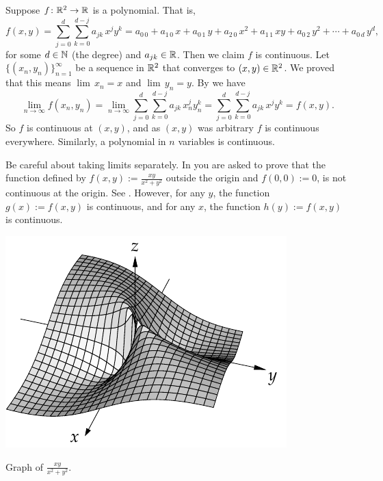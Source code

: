 \begin{example}
Suppose $f \colon {\mathbb{R}}^2 \to {\mathbb{R}}$ is a polynomial.  That is,
\begin{equation*}
f(x,y) =
\sum_{j=0}^d
\sum_{k=0}^{d-j}
a_{jk}\,x^jy^k =
a_{0\,0} + a_{1\,0} \, x +
a_{0\,1} \, y+  
a_{2\,0} \, x^2+  
a_{1\,1} \, xy+  
a_{0\,2} \, y^2+ \cdots +
a_{0\,d} \, y^d ,
\end{equation*}
for some $d \in {\mathbb{N}}$ (the degree) and $a_{jk} \in {\mathbb{R}}$.  Then we claim 
$f$ is continuous.  Let $\{ (x_n,y_n) \}_{n=1}^\infty$ be a sequence
in ${\mathbb{R}}^2$ that converges to $(x,y) \in {\mathbb{R}}^2$.  We proved that this
means $\lim\, x_n = x$ and $\lim\, y_n = y$.
By  we have
\begin{equation*}
\lim_{n\to\infty}
f(x_n,y_n) =
\lim_{n\to\infty}
\sum_{j=0}^d
\sum_{k=0}^{d-j}
a_{jk} \, x_n^jy_n^k 
=
\sum_{j=0}^d
\sum_{k=0}^{d-j}
a_{jk} \, x^jy^k
=
f(x,y) .
\end{equation*}
So $f$ is continuous at $(x,y)$, and as $(x,y)$ was arbitrary $f$ is
continuous everywhere.  Similarly, a
polynomial in $n$ variables is continuous.
\end{example}

Be careful about taking limits separately.  In 
you are asked to prove that the function defined by $f(x,y) := \frac{xy}{x^2+y^2}$
outside the origin and $f(0,0) := 0$, is not continuous at the origin.  See
.
However, for any $y$, the function $g(x) := f(x,y)$ is
continuous,
and for any $x$, the function $h(y) := f(x,y)$ is continuous.
\begin{myfigureht}
\includegraphics{figures/xyxsqysq}
\caption{Graph of $\frac{xy}{x^2+y^2}$.\label{fig:xyxsqysq}}
\end{myfigureht}

